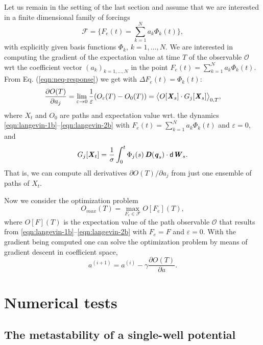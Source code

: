 \documentclass[aip,jcp,a4paper,reprint,onecolumn]{revtex4-1}
\newcommand{\vect}[1]{\textbf{\textit{#1}}}
\newcommand{\dd}{\textsf{d}}
\newcommand{\eps}{\varepsilon}
\begin{document}
Let us remain in the setting of the last section and assume that we are interested in a finite dimensional family of forcings
\[
\mathcal{F}=\{F_e(t)=\sum_{k=1}^N a_k \Phi_k(t)\},
\]
with explicitly given basis functions $\Phi_k$, $k=1,\ldots,N$.
We are interested in computing the gradient of the expectation value at time $T$ of the observable $\mathcal{O}$ wrt the coefficient vector $(a_k)_{k=1,\ldots,N}$ in the point $F_e(t)=\sum_{k=1}^N a_k \Phi_k(t)$. From Eq. (\ref{eqn:neq-response}) we get with $\Delta F_e(t)=\Phi_k(t)$:
\[
\frac{\partial O(T)}{\partial a_j} = \lim_{\eps\to 0}\frac{1}{\eps}( O_\eps(T) -
  O_0(T))=\big\langle O[\vect X_s]\cdot G_j[\vect X_s]\big\rangle_{0,T},
\]
where $X_t$ and $O_0$ are paths and expectation value wrt. the dynamics \eqref{eqn:langevin-1b}--\eqref{eqn:langevin-2b} with $F_e(t)=\sum_{k=1}^N a_k \Phi_k(t)$ and $\eps=0$, and
\[
G_j[\vect X_t]
  = \frac{1}\sigma\int_0^t
  \Phi_j(s)\,\vect D(\vect q_s)\cdot\dd\vect W_s. 
\]
That is, we can compute all derivatives $\partial O(T)/\partial a_j$ from just one ensemble of paths of $X_t$. 

Now we consider the optimization problem
\[
O_{max}(T) = \max_{F_e\in \mathcal{F}} O[F_e](T),
\]
where $O[F](T)$ is the expectation value of the path observable $\mathcal{O}$ that results from \eqref{eqn:langevin-1b}--\eqref{eqn:langevin-2b} with $F_e=F$ and $\eps=0$.
With the gradient being computed one can solve the optimization problem by means of gradient descent in coefficient space,
\[
a^{(i+1)}=a^{(i)} -\gamma \frac{\partial O(T)}{\partial a}.
\]


\section{Numerical tests}

\subsection{The metastability of a single-well potential}
\end{document}
